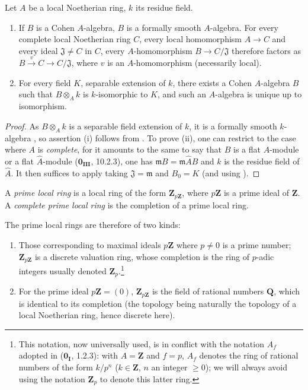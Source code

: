 \begin{theorem}[19.8.2]
\label{0.19.8.2}
Let $A$ be a local Noetherian ring, $k$ its residue field.
\begin{enumerate}
  \item[\rm(i)] If $B$ is a Cohen $A$-algebra, $B$ is a formally smooth $A$-algebra.
For every complete local Noetherian ring $C$, every local homomorphism $A\to C$ and every ideal $\mathfrak{J}\neq C$ in $C$, every $A$-homomorphism $B\to C/\mathfrak{J}$ therefore factors as $B\xrightarrow{v}C\to C/\mathfrak{J}$, where $v$ is an $A$-homomorphism (necessarily local).
  \item[\rm(ii)] For every field $K$, separable extension of $k$, there exists a Cohen $A$-algebra $B$ such that $B\otimes_A k$ is $k$-isomorphic to $K$, and such an $A$-algebra is unique up to isomorphism.
\end{enumerate}
\end{theorem}

\begin{proof}
As $B\otimes_A k$ is a separable field extension of $k$, it is a formally smooth $k$-algebra , so assertion (i) follows from .
To prove (ii), one can restrict to the case where $A$ is \emph{complete}, for it amounts to the same to say that $B$ is a flat $A$-module or a flat $\widehat{A}$-module ($\mathbf{0_{III}}$, 10.2.3), one has $\mathfrak{m}B=\mathfrak{m}\widehat{A}B$ and $k$ is the residue field of $\widehat{A}$.
It then suffices to apply  taking $\mathfrak{J}=\mathfrak{m}$ and $B_0=K$ (and using ).
\end{proof}

\begin{definition}[19.8.3]
\label{0.19.8.3}
A \emph{prime local ring} is a local ring of the form $\mathbf{Z}_{p\mathbf{Z}}$, where $p\mathbf{Z}$ is a prime ideal of $\mathbf{Z}$.
A \emph{complete prime local ring} is the completion of a prime local ring.
\end{definition}

The prime local rings are therefore of two kinds:
\begin{enumerate}
  \item[$1^\circ$] Those corresponding to maximal ideals $p\mathbf{Z}$ where $p\neq 0$ is a prime number; $\mathbf{Z}_{p\mathbf{Z}}$ is a discrete valuation ring, whose completion is the ring of $p$-adic integers usually denoted $\mathbf{Z}_p$.\footnote{This notation, now universally used, is in conflict with the notation $A_f$ adopted in ($\mathbf{0_I}$, 1.2.3): with $A=\mathbf{Z}$ and $f=p$, $A_f$ denotes the ring of rational numbers of the form $k/p^n$ ($k\in\mathbf{Z}$, $n$ an integer $\geq 0$); we will always avoid using the notation $\mathbf{Z}_p$ to denote this latter ring.}
  \item[$2^\circ$] For the prime ideal $p\mathbf{Z}=(0)$, $\mathbf{Z}_{p\mathbf{Z}}$ is the field of rational numbers $\mathbf{Q}$, which is identical to its completion (the topology being naturally the topology of a local Noetherian ring, hence discrete here).
\end{enumerate}

